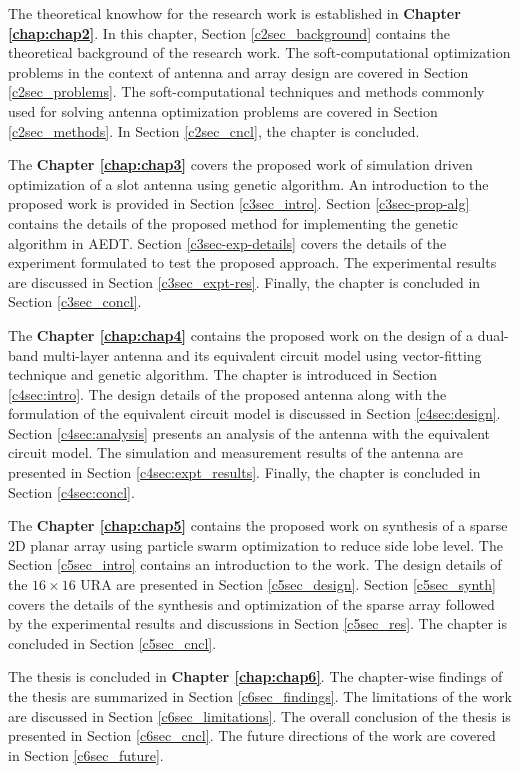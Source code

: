 The theoretical knowhow for the research work is established in \textbf{Chapter \ref{chap:chap2}}. In this chapter, Section \ref{c2sec_background} contains the theoretical background of the research work. The soft-computational optimization problems in the context of antenna and array design are covered in Section \ref{c2sec_problems}. The soft-computational techniques and methods commonly used for solving antenna optimization problems are covered in Section \ref{c2sec_methods}. In Section \ref{c2sec_cncl}, the chapter is concluded.

The \textbf{Chapter \ref{chap:chap3}} covers the proposed work of simulation driven optimization of a slot antenna using genetic algorithm. An introduction to the proposed work is provided in Section \ref{c3sec_intro}. Section \ref{c3sec-prop-alg} contains the details of the proposed method for implementing the genetic algorithm in AEDT. Section \ref{c3sec-exp-details} covers the details of the experiment formulated to test the proposed approach. The experimental results are discussed in Section \ref{c3sec_expt-res}. Finally, the chapter is concluded in Section \ref{c3sec_concl}.

The \textbf{Chapter \ref{chap:chap4}} contains the proposed work on the design of a dual-band multi-layer antenna and its equivalent circuit model using vector-fitting technique and genetic algorithm. The chapter is introduced in Section \ref{c4sec:intro}.  The design details of the proposed antenna along with the formulation of the equivalent circuit model is discussed in Section \ref{c4sec:design}. Section \ref{c4sec:analysis} presents an analysis of the antenna with the equivalent circuit model. The simulation and measurement results of the antenna are presented in Section \ref{c4sec:expt_results}. Finally, the chapter is concluded in Section \ref{c4sec:concl}.

The \textbf{Chapter \ref{chap:chap5}} contains the proposed work on synthesis of a sparse 2D planar array using particle swarm optimization to reduce side lobe level. The Section \ref{c5sec_intro} contains an introduction to the work. The design details of the $16\times16$ URA are presented in Section \ref{c5sec_design}. Section \ref{c5sec_synth} covers the details of the synthesis and optimization of the sparse array followed by the experimental results and discussions in Section \ref{c5sec_res}. The chapter is concluded in Section \ref{c5sec_cncl}.

The thesis is concluded in \textbf{Chapter \ref{chap:chap6}}. The chapter-wise findings of the thesis are summarized in Section \ref{c6sec_findings}. The limitations of the work are discussed in Section \ref{c6sec_limitations}. The overall conclusion of the thesis is presented in Section \ref{c6sec_cncl}. The future directions of the work are covered in Section \ref{c6sec_future}.
